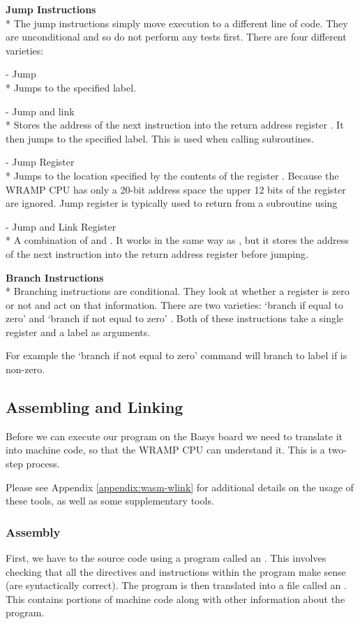 \textbf{Jump Instructions}\\*
The jump instructions simply move execution to a different line of
code. They are unconditional and so do not perform any tests first.
There are four different varieties:

 - Jump\\*
Jumps to the specified label.

 - Jump and link\\*
Stores the address of the next instruction into the return address register
. It then jumps to the specified label. This is used when calling
subroutines.

 - Jump Register\\*
Jumps to the location specified by the contents of the register \regs.
Because the WRAMP CPU has only a 20-bit address space the upper 12 bits
of the register are ignored. Jump register is typically used to
return from a subroutine using 

 - Jump and Link Register\\* 
A combination of  and . 
It works in the same way as , but it stores the address of the
next instruction into the return address register before jumping.

\textbf{Branch Instructions}\\*
Branching instructions are conditional. They look at whether a
register is zero or not and act on that information. There are two
varieties: `branch if equal to zero'  and `branch if not
equal to zero' . Both of these instructions take a single
register and a label as arguments.

For example the `branch if not equal to zero' command
 will branch to label  if
 is non-zero.

\subsection{Assembling and Linking}
Before we can execute our program on the Basys board we need to
translate it into machine code, so that the WRAMP CPU can understand it.
This is a two-step process.

Please see Appendix \ref{appendix:wasm-wlink} for additional details
on the usage of these tools, as well as some supplementary tools.

\subsubsection{Assembly}
First, we have to  the source code using a program
called an . This involves checking that all the
directives and instructions within the program make sense (are
syntactically correct). The program is then translated into a file
called an . This contains portions of machine code
along with other information about the program.

